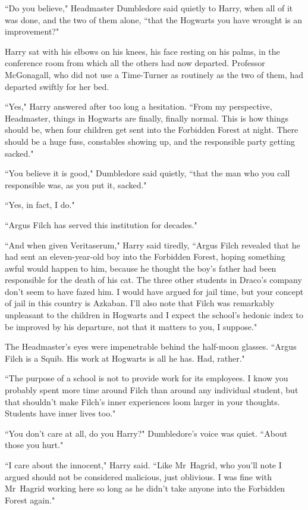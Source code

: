 ``Do you believe," Headmaster Dumbledore said quietly to Harry, when all of it was done, and the two of them alone, ``that the Hogwarts you have wrought is an improvement?"

Harry sat with his elbows on his knees, his face resting on his palms, in the conference room from which all the others had now departed. Professor McGonagall, who did not use a Time-Turner as routinely as the two of them, had departed swiftly for her bed.

``Yes," Harry answered after too long a hesitation. ``From my perspective, Headmaster, things in Hogwarts are finally, finally normal. This is how things should be, when four children get sent into the Forbidden Forest at night. There should be a huge fuss, constables showing up, and the responsible party getting sacked."

``You believe it is good," Dumbledore said quietly, ``that the man who you call responsible was, as you put it, sacked."

``Yes, in fact, I do."

``Argus Filch has served this institution for decades."

``And when given Veritaserum," Harry said tiredly, ``Argus Filch revealed that he had sent an eleven-year-old boy into the Forbidden Forest, hoping something awful would happen to him, because he thought the boy's father had been responsible for the death of his cat. The three other students in Draco's company don't seem to have fazed him. I would have argued for jail time, but your concept of jail in this country is Azkaban. I'll also note that Filch was remarkably unpleasant to the children in Hogwarts and I expect the school's hedonic index to be improved by his departure, not that it matters to you, I suppose."

The Headmaster's eyes were impenetrable behind the half-moon glasses. ``Argus Filch is a Squib. His work at Hogwarts is all he has. Had, rather."

``The purpose of a school is not to provide work for its employees. I know you probably spent more time around Filch than around any individual student, but that shouldn't make Filch's inner experiences loom larger in your thoughts. Students have inner lives too."

``You don't care at all, do you Harry?" Dumbledore's voice was quiet. ``About those you hurt."

``I care about the innocent," Harry said. ``Like Mr~Hagrid, who you'll note I argued should not be considered malicious, just oblivious. I was fine with Mr~Hagrid working here so long as he didn't take anyone into the Forbidden Forest again."

